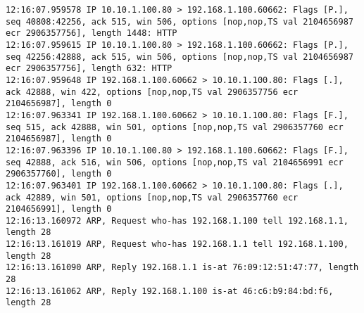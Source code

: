 \documentclass{article}
\begin{document}
{\begin{lstlisting}
12:16:07.959578 IP 10.10.1.100.80 > 192.168.1.100.60662: Flags [P.], seq 40808:42256, ack 515, win 506, options [nop,nop,TS val 2104656987 ecr 2906357756], length 1448: HTTP
12:16:07.959615 IP 10.10.1.100.80 > 192.168.1.100.60662: Flags [P.], seq 42256:42888, ack 515, win 506, options [nop,nop,TS val 2104656987 ecr 2906357756], length 632: HTTP
12:16:07.959648 IP 192.168.1.100.60662 > 10.10.1.100.80: Flags [.], ack 42888, win 422, options [nop,nop,TS val 2906357756 ecr 2104656987], length 0
12:16:07.963341 IP 192.168.1.100.60662 > 10.10.1.100.80: Flags [F.], seq 515, ack 42888, win 501, options [nop,nop,TS val 2906357760 ecr 2104656987], length 0
12:16:07.963396 IP 10.10.1.100.80 > 192.168.1.100.60662: Flags [F.], seq 42888, ack 516, win 506, options [nop,nop,TS val 2104656991 ecr 2906357760], length 0
12:16:07.963401 IP 192.168.1.100.60662 > 10.10.1.100.80: Flags [.], ack 42889, win 501, options [nop,nop,TS val 2906357760 ecr 2104656991], length 0
12:16:13.160972 ARP, Request who-has 192.168.1.100 tell 192.168.1.1, length 28
12:16:13.161019 ARP, Request who-has 192.168.1.1 tell 192.168.1.100, length 28
12:16:13.161090 ARP, Reply 192.168.1.1 is-at 76:09:12:51:47:77, length 28
12:16:13.161062 ARP, Reply 192.168.1.100 is-at 46:c6:b9:84:bd:f6, length 28

\end{lstlisting}
}
\end{document}
